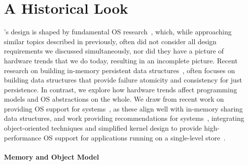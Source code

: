 \fi

\section{A Historical Look}
\label{sec:historical}





\Twizzler's design
is shaped by fundamental OS
research~\cite{corbato_introduction_1965,chase:tocs94,k42,engler:sosp95,Kaashoek,engler1995avm,engler1995exterminate},
which,
while approaching similar topics described in
previously, often did not consider all design
requirements we discussed simultaneously, nor did they have a picture of hardware trends that we do today, resulting in an incomplete picture.
Recent research on building in-memory persistent data structures~\cite{volos:asplos11,coburn:asplos11,condit:sosp09,debnath:vldb10,lu:tos16,hu:atc17},
often focuses on building data structures that
provide failure atomicity and consistency for just persistence.
In contrast, we explore how hardware trends affect programming models and OS abstractions on the whole.
We draw from recent work on providing OS support for \NVM systems~\cite{caulfield:micro10}, as these align well with
in-memory sharing data structures, and work
providing recommendations for \NVM systems~\cite{mehra:ipdps04}, integrating
object-oriented techniques and simplified kernel design
to provide high-performance OS support for applications running on a single-level
store~\cite{shapiro:sosp99,bailey:hotos11}.


\paragraph{Memory and Object Model}


